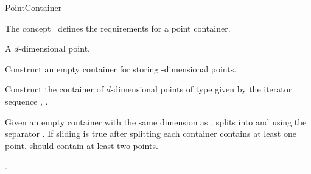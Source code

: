 

\begin{ccRefConcept}{PointContainer}


\begin{ccAdvanced}

\ccDefinition
  
The concept \ccRefName\ defines the requirements for
a point container. 


\ccTypes

 { A $d$-dimensional point.}
\ccCreation
{}  %

{
Construct an empty container for storing -dimensional points.
}

{
Construct the container of $d$-dimensional points of type 
given by the iterator sequence , .
}

\ccOperations

{Given an empty container  with the same dimension as , splits  into
 and  using the separator . If sliding is true after splitting 
each container contains at least one point.  should contain at least two points.}

\ccHasModels

.

\ccSeeAlso

\\
\\

\end{ccAdvanced}
\end{ccRefConcept}


